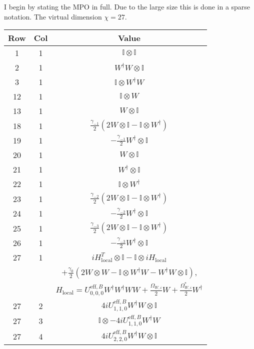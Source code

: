 I begin by stating the MPO in full. Due to the large size this is done in a sparse notation. The virtual dimension \(\chi = 27\).

\begin{longtable}{ccc}
	\hline
	Row & Col & Value \\
	\hline
	1 & 1 & \(\mathbb{I} \otimes \mathbb{I}\)  \\
	2 & 1 & \(W^{\dagger}W \otimes \mathbb{I}\)  \\
	3 & 1 & \(\mathbb{I} \otimes W^{\dagger}W\)  \\
	12 & 1 & \(\mathbb{I} \otimes W\)  \\
	13 & 1 & \(W \otimes \mathbb{I}\)  \\
	18 & 1 & \(\frac{\gamma_{-1}}{2}\left( 2W \otimes \mathbb{I} - \mathbb{I} \otimes W^{\dagger}\right)\)  \\
	19 & 1 & \(-\frac{\gamma_{-1}}{2}W^{\dagger} \otimes \mathbb{I}\)  \\
	20 & 1 & \(W \otimes \mathbb{I}\)  \\
	21 & 1 & \(W^{\dagger} \otimes \mathbb{I}\)  \\
	22 & 1 & \(\mathbb{I} \otimes W^{\dagger}\)  \\
	23 & 1 & \(\frac{\gamma_{-2}}{2}\left( 2W \otimes \mathbb{I} - \mathbb{I} \otimes W^{\dagger} \right)\)  \\
	24 & 1 & \(-\frac{\gamma_{-2}}{2}W^{\dagger} \otimes \mathbb{I}\)  \\
	25 & 1 & \(\frac{\gamma_{-3}}{2}\left( 2W \otimes \mathbb{I} - \mathbb{I} \otimes W^{\dagger} \right)\) \\
	26 & 1 & \(-\frac{\gamma_{-3}}{2}W^{\dagger} \otimes \mathbb{I} \)  \\
	\hline
	27 & 1 & \(iH_{\mathrm{local}}^{T} \otimes \mathbb{I} - \mathbb{I} \otimes iH_{\mathrm{local}}\) \\ 
	   &   & \(+ \frac{\gamma_{0}}{2}\left(2W \otimes W - \mathbb{I} \otimes W^{\dagger}W - W^{\dagger}W \otimes \mathbb{I}\right)\), \\
	   &   & \(H_{\mathrm{local}} = U^{\mathrm{eff},B}_{0,0,0}W^{\dagger}W^{\dagger}WW + \frac{\Omega_{W,i}}{2}W + \frac{\Omega_{W,i}^{*}}{2}W^{\dagger}\) \\  
	\hline
	27 & 2  & \(4iU^{\mathrm{eff},B}_{1,1,0}W^{\dagger}W \otimes \mathbb{I}\) \\
	27 & 3  & \(\mathbb{I} \otimes -4iU^{\mathrm{eff},B}_{1,1,0}W^{\dagger}W\) \\
	27 & 4  & \(4iU^{\mathrm{eff},B}_{2,2,0}W^{\dagger}W \otimes \mathbb{I}\) \\

\end{longtable}
